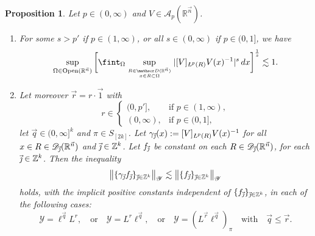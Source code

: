 \documentclass[11pt, reqno]{amsart}
\newtheorem{proposition}[theorem]{Proposition}
\theoremstyle{definition}
\theoremstyle{remark}
\numberwithin{equation}{section}
\newcommand{\A}{\mathscr A}
\newcommand{\D}{\mathscr D}
\newcommand{\R}{\mathbb R}
\newcommand{\Ys}{\mathscr Y}
\newcommand{\Z}{\mathbb Z}
\newcommand{\vone}{\vec 1}
\newcommand{\vj}{\vec{\textit{\j}}}
\newcommand{\vn}{\vec n}
\newcommand{\vq}{\vec q}
\newcommand{\vr}{\vec r}
\newcommand{\aveL}{\textit{\L}}
\newcommand{\abs}[1]{|#1|}
\newcommand{\bNorm}[2]{\big\|#1\big\|_{#2}}
\newcommand{\Open}{\mathrm{Open}}
\begin{document}
\begin{proposition}\label{dualCarl}
Let $p\in(0,\infty)$ and $V\in\A_p(\R^{\vec n})$.
\begin{enumerate}[\rm(i)]
\item\label{dualCarl1}
For some $s>p'$ if $p\in(1,\infty)$, or all $s\in(0,\infty)$ if $p\in(0,1]$, we have
\begin{equation}\label{dualCarl10}
  \sup_{\Omega\in\Open(\R^{\vn})}
  \bigg[\fint_\Omega \sup_{\genfrac{}{}{0pt}{}{R\in\D(\R^{\vn})}{x\in R\subset\Omega}}
  \abs{[V]_{\aveL^p(R)}V(x)^{-1}}^s \, dx\bigg]^{\frac1s}
  \lesssim 1.
\end{equation}

\item\label{dualCarl2} Let moreover $\vr=r\cdot\vone$ with
\begin{equation}\label{r vs p}
r\in
\begin{cases}
(0,p'], & \text{if } p\in(1,\infty), \\
(0,\infty), & \text{if } p\in(0,1],
\end{cases}
\end{equation}
let $\vq\in(0,\infty]^k$ and $\pi\in S_{[2k]}$.
Let $\gamma_{\vj}(x):=[V]_{\aveL^p(R)}V(x)^{-1}$ for all $x\in R\in\D_{\vj}(\R^{\vn})$ and $\vj\in\Z^k$.
Let $f_{\vj}$ be constant on each $R\in\D_{\vj}(\R^{\vn})$, for each $\vj\in\Z^k$.
Then the inequality
\begin{equation*}
\bNorm{\{\gamma_{\vj}f_{\vj}\}_{\vj\in\Z^k}}{\Ys}
\lesssim\bNorm{\{ f_{\vj}\}_{\vj\in\Z^k}}{\Ys}
\end{equation*}
holds, with the implicit positive constants independent of $\{f_{\vj}\}_{\vj\in\Z^k}$, in each of the following cases:
\begin{equation*}
\Ys =\ell^{\vq}L^r,\quad\text{or}\quad
\Ys = L^r\ell^{\vq},\quad\text{or}\quad
\Ys = (L^{\vr}\ell^{\vq})_\pi\quad\text{with}\quad \vq\leq\vr.
\end{equation*}
\end{enumerate}
\end{proposition}
\end{document}
